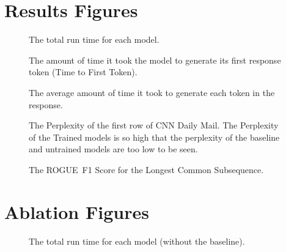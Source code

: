 \documentclass[
	title={Lottery Ticket Hypothesis for Large Language Models}
]{cs595project}
\newcommand{\ROUGE}{ROGUE}
\newcommand{\ablationunix}{1778204079} %
\providecommand{\ablationunix}{1778204079}
\begin{document}
\section{Results Figures}\label{sec:results-figures}
\begin{figure}[H]
	\centering
	\resizebox{\textwidth}{!}{}
	\caption{The total run time for each model.}
	\label{fig:run-time-baseline}
\end{figure}

\begin{figure}[H]
	\centering
	\resizebox{\textwidth}{!}{}
	\caption{The amount of time it took the model to generate its first response token (Time to First Token).}
	\label{fig:ttft-baseline}
\end{figure}

\begin{figure}[H]
	\centering
	\resizebox{\textwidth}{!}{}
	\caption{The average amount of time it took to generate each token in the response.}
	\label{fig:tpot-baseline}
\end{figure}

\begin{figure}[H]
	\centering
	\resizebox{\textwidth}{!}{}
	\caption{The Perplexity of the first row of CNN Daily Mail. The Perplexity of the Trained models is so high that the perplexity of the baseline and untrained models are too low to be seen.}
	\label{fig:perplexity-baseline}
\end{figure}

\begin{figure}[H]
	\centering
	\resizebox{\textwidth}{!}{}
	\caption{The \ROUGE\ F1 Score for the Longest Common Subsequence.}
	\label{fig:rogue-l-baseline}
\end{figure}

\section{Ablation Figures}\label{sec:ablations-figures}
\begin{figure}[H]
	\centering
	\resizebox{\textwidth}{!}{}
	\caption{The total run time for each model (without the baseline).}
	\label{fig:run-time}
\end{figure}
\end{document}

